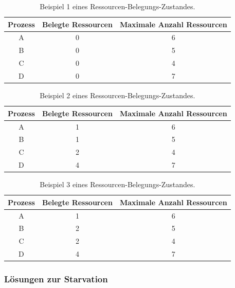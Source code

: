 \begin{description}
\begin{description}
							\begin{table}
								\caption{Beispiel 1 eines Ressourcen-Belegungs-Zustandes.}
								\begin{tabular}{c|c|c}
									Prozess & Belegte Ressourcen & Maximale Anzahl Ressourcen \\
									\hline
									A & 0 & 6 \\
									B & 0 & 5 \\
									C & 0 & 4 \\
									D & 0 & 7 \\
								\end{tabular}
								\label{tab:BspRessourcenBelegungsZustand1}
							\end{table}
							
							\begin{table}
								\caption{Beispiel 2 eines Ressourcen-Belegungs-Zustandes.}
								\begin{tabular}{c|c|c}
									Prozess & Belegte Ressourcen & Maximale Anzahl Ressourcen \\
									\hline
									A & 1 & 6 \\
									B & 1 & 5 \\
									C & 2 & 4 \\
									D & 4 & 7 \\
								\end{tabular}
								\label{tab:BspRessourcenBelegungsZustand2}
							\end{table}
							
							\begin{table}
								\caption{Beispiel 3 eines Ressourcen-Belegungs-Zustandes.}
								\begin{tabular}{c|c|c}
									Prozess & Belegte Ressourcen & Maximale Anzahl Ressourcen \\
									\hline
									A & 1 & 6 \\
									B & 2 & 5 \\
									C & 2 & 4 \\
									D & 4 & 7 \\
								\end{tabular}
								\label{tab:BspRessourcenBelegungsZustand3}
							\end{table}
						\end{description}
				\end{description}
			
			\subsubsection{Lösungen zur Starvation}
			
